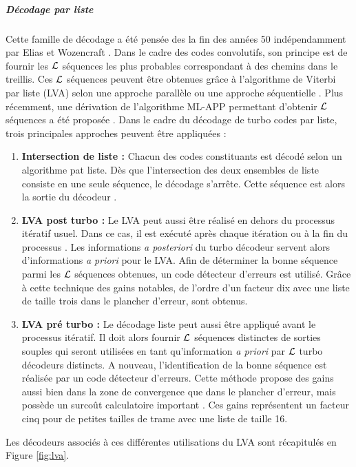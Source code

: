 \subparagraph{Décodage par liste} Cette famille de décodage a été pensée des la fin des années 50 indépendamment par Elias 
et Wozencraft \cite{elias1957list,wozencraft1958list}. Dans le cadre des codes convolutifs, son principe est de fournir 
les $\cal{L}$ séquences les plus probables correspondant à des chemins dans le treillis. Ces $\cal{L}$ séquences peuvent 
être obtenues grâce à l'algorithme de Viterbi par liste (LVA) selon une approche parallèle ou une approche séquentielle 
\cite{lva}. Plus récemment, une dérivation de l'algorithme ML-APP permettant d'obtenir $\cal{L}$ séquences a été proposée 
\cite{mlla}.
Dans le cadre du décodage de turbo codes par liste, trois principales approches peuvent être appliquées :
\begin{enumerate}
	\item \textbf{Intersection de liste : } Chacun des codes constituants est décodé selon un algorithme pat liste. Dès 
	que l'intersection des deux ensembles de liste consiste en une seule séquence, le décodage s'arrête. Cette séquence 
	est alors la sortie du décodeur \cite{sadowPair}. 
	\item \textbf{LVA post turbo : }  Le LVA peut aussi être réalisé en dehors du processus itératif usuel. Dans ce cas, 
	il est exécuté après chaque itération ou à la fin du processus \cite{narayaList}. Les informations \textit{a posteriori} 
	du turbo décodeur servent alors d'informations \textit{a priori} pour le LVA. Afin de déterminer la bonne séquence 
	parmi les $\cal{L}$ séquences obtenues, un code détecteur d'erreurs est utilisé. Grâce à cette technique des gains 
	notables, de l'ordre d'un facteur dix avec une liste de taille trois dans le plancher d'erreur, sont obtenus.
	\item \textbf{LVA pré turbo : } Le décodage liste peut aussi être appliqué avant le processus itératif. Il doit alors 
	fournir $\cal{L}$ séquences distinctes de sorties souples qui seront utilisées en tant qu'information \textit{a priori} 
	par $\cal{L}$ turbo décodeurs distincts. A nouveau, l'identification de la bonne séquence est réalisée par un code 
	détecteur d'erreurs. Cette méthode propose des gains aussi bien dans la zone de convergence que dans le plancher 
	d'erreur, mais possède un surcoût calculatoire important \cite{newList}. Ces gains représentent un facteur cinq pour 
	de petites tailles de trame avec une liste de taille 16.
\end{enumerate}

Les décodeurs associés à ces différentes utilisations du LVA sont récapitulés en Figure \ref{fig:lva}. 


